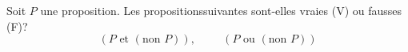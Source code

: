 Soit $P$ une proposition. Les propositionssuivantes sont-elles vraies (V) ou fausses (F)?
\begin{displaymath}
\left( P \text{ et } (\text{non } P) \right), \hspace{1cm} \left( P \text{ ou } (\text{non } P) \right)  
\end{displaymath}
\bigskip